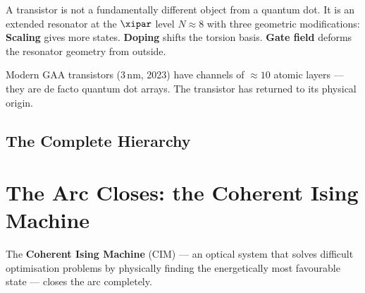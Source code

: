 \begin{keyresult}
A transistor is not a fundamentally different object from a quantum dot.
It is an extended resonator at the $\xipar$ level $N \approx 8$
with three geometric modifications:
\textbf{Scaling} gives more states.
\textbf{Doping} shifts the torsion basis.
\textbf{Gate field} deforms the resonator geometry from outside.

Modern GAA transistors (3\,nm, 2023) have channels of
$\approx 10$ atomic layers --- they are de facto quantum dot arrays.
The transistor has returned to its physical origin.
\end{keyresult}

\subsection{The Complete Hierarchy}

\begin{center}
\end{center}

\section{The Arc Closes: the Coherent Ising Machine}
\label{sec:ising}

The \textbf{Coherent Ising Machine} (CIM) ---
an optical system that solves difficult optimisation problems
by physically finding the energetically most favourable state
--- closes the arc completely.

